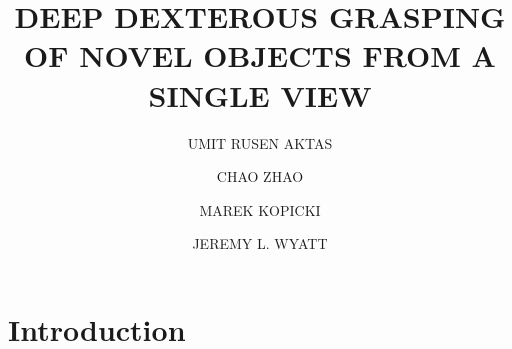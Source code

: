 \documentclass{ws-ijhr}
\begin{document}

%
\catchline{}{}{}{}{}
%

\title{DEEP DEXTEROUS GRASPING OF NOVEL OBJECTS FROM A SINGLE VIEW}

\author{UMIT RUSEN AKTAS}

\address{Intelligent Robotics Lab, University of Birmingham,\\
Birmingham, West Midlands, B15 2TT, UK\\
rusenaktas@gmail.com}

\author{CHAO ZHAO}

\address{Robotics Institute, Department of Electronic\\
and Computer Engineering, HKUST, Hongkong, China\\
czhaobb@connect.ust.hk}

\author{MAREK KOPICKI}

\address{Intelligent Robotics Lab, University of Birmingham,\\
Birmingham, West Midlands, B15 2TT, UK\\
marek.kopicki@gmail.com}

\author{JEREMY L. WYATT}

\address{Intelligent Robotics Lab, University of Birmingham,\\
Birmingham, West Midlands, B15 2TT, UK\\
jeremy.l.wyatt@gmail.com}

\maketitle


\begin{abstract}

\end{abstract}


\section{Introduction}
\end{document}
